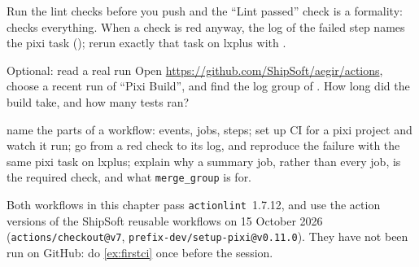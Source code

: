 \begin{note}
Run the lint checks before you push and the ``Lint passed'' check is a
formality:  checks everything. When a check is red
anyway, the log of the failed step names the pixi task (); rerun exactly that task on lxplus with
.
\end{note}

\begin{exercise}[colback=white]{Optional: read a real run}
Open \url{https://github.com/ShipSoft/aegir/actions}, choose a recent run of
``Pixi Build'', and find the log group of . How
long did the build take, and how many tests ran?
\end{exercise}

\begin{levelcheck}
\begin{itemize}
  \can name the parts of a workflow: events, jobs, steps;
  \can set up CI for a pixi project and watch it run;
  \can go from a red check to its log, and reproduce the failure with the
       same pixi task on lxplus;
  \can explain why a summary job, rather than every job, is the required
       check, and what \texttt{merge\_group} is for.
\end{itemize}
\end{levelcheck}

\begin{solution}
Both workflows in this chapter pass \texttt{actionlint}~1.7.12, and use the
action versions of the ShipSoft reusable workflows on 15 October 2026
(\texttt{actions/checkout@v7}, \texttt{prefix-dev/setup-pixi@v0.11.0}). They
have not been run on GitHub: do \cref{ex:firstci} once before the session.
\end{solution}
